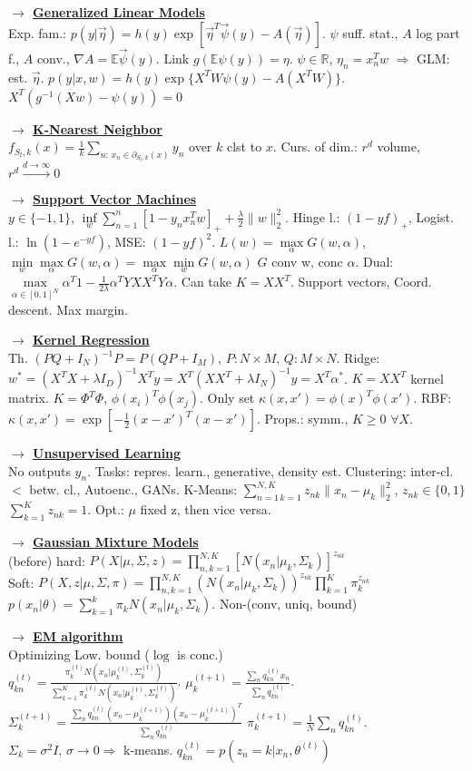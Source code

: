\documentclass[11pt]{article}
\newcommand{\mytitle}[1]{ {\bf $\rightarrow$ \underline{#1}}\\}
\begin{document}
\begin{multicols*}{2}
\mytitle{Generalized Linear Models}
Exp. fam.: $p(y|\vec{\eta})=h(y)\exp\left[\vec{\eta}^T\vec{\psi}(y)-A(\vec{\eta})\right]$.
$\psi$ suff. stat., $A$ log part f.,
$A$ conv., $\nabla A=\mathbb{E}\vec{\psi}(y)$. Link $g(\mathbb{E}\psi(y))=\eta$.
$\psi\in \mathbb{R}$, $\eta_n=x_n^Tw$ $\Rightarrow$ GLM: est. $\vec{\eta}$.
$p(y|x,w)=h(y)\exp\{X^TW\psi(y)-A(X^TW)\}$.
$X^T(g^{-1}(Xw)-\psi(y))=0$

\mytitle{K-Nearest Neighbor}
$f_{S_t,k}(x)=\frac{1}{k}\sum\limits_{n\colon\,x_n\in \partial_{S_t,k}(x)}y_n$ over $k$ clst to $x$.
Curs. of dim.: $r^d$ volume, $r^d\overset{d\to\infty}\to 0$

\mytitle{Support Vector Machines}
$y\in\{-1,1\}$, $\inf\limits_w\sum\limits_{n=1}^n\left[1-y_nx_n^Tw\right]_++\frac{\lambda}{2}\|w\|^2_2$.
Hinge l.: $(1-yf)_+$, Logist. l.: $\ln(1-e^{-yf})$, MSE: $(1-yf)^2$.
$L(w)=\max\limits_\alpha G(w,\alpha)$, $\min\limits_w\max\limits_\alpha G(w,\alpha)=\max\limits_\alpha\min\limits_w G(w,\alpha)$
$G$ conv w, conc $\alpha$.
Dual: $\max\limits_{\alpha\in[0,1]^N}\alpha^T1-\frac{1}{2\lambda}\alpha^TYXX^TY\alpha$.
Can take $K=XX^T$. Support vectors, Coord. descent. Max margin.

\mytitle{Kernel Regression}
Th. $(PQ+I_N)^{-1}P=P(QP+I_M)$, $P\colon N\times M$, $Q\colon M\times N$.
Ridge: $w^*=(X^TX+\lambda I_D)^{-1}X^Ty=X^T(XX^T+\lambda I_N)^{-1}y=X^T\alpha^*$.
$K=XX^T$ kernel matrix. $K=\Phi^T\Phi$, $\phi(x_i)^T\phi(x_j)$.
Only set $\kappa(x,x')=\phi(x)^T\phi(x')$.
RBF: $\kappa(x,x')=\exp\left[-\frac{1}{2}(x-x')^T(x-x')\right]$.
Props.: symm., $K\geqslant 0$ $\forall X$.

\mytitle{Unsupervised Learning}
No outputs $y_n$. Tasks: repres. learn., generative, density est.
Clustering: inter-cl. $<$ betw. cl., Autoenc., GANs.
K-Means: $\sum\limits_{n=1\,k=1}^{N,K}z_{nk}\|x_n-\mu_k\|_2^2$, $z_{nk}\in\{0,1\}$
$\sum\limits_{k=1}^Kz_{nk}=1$. Opt.: $\mu$ fixed z, then vice versa.

\mytitle{Gaussian Mixture Models}
(before) hard: $P(X|\mu,\Sigma,z)=\prod\limits_{n,k=1}^{N,K}\left[N(x_n|\mu_k,\Sigma_k)\right]^{z_{nk}}$\\
Soft: $P(X,z|\mu,\Sigma,\pi)=\prod\limits_{n,k=1}^{N,K}(N(x_n|\mu_k,\Sigma_k))^{z_{nk}}\prod\limits_{k=1}^K\pi_k^{z_{nk}}$\\
$p(x_n|\theta)=\sum\limits_{k=1}^k\pi_kN(x_n|\mu_k,\Sigma_k)$.
Non-(conv, uniq, bound)

\mytitle{EM algorithm}
Optimizing Low. bound ($\log$ is conc.)\\
$q_{kn}^{(t)}=\frac{\pi_k^{(t)}N(x_n|\mu_k^{(t)},\Sigma_k^{(t)})}{\sum\limits_{k=1}^K\pi_k^{(t)}N(x_n|\mu_k^{(t)},\Sigma_k^{(t)})}$.
$\mu_k^{(t+1)}=\frac{\sum_nq_{kn}^{(t)}x_n}{\sum_n q_{kn}^{(t)}}$.\\
$\Sigma_k^{(t+1)}=\frac{\sum_nq_{kn}^{(t)}(x_n-\mu_k^{(t+1)})(x_n-\mu_k^{(t+1)})^T}{\sum_nq_{kn}^{(t)}}$
$\pi_k^{(t+1)}=\frac{1}{N}\sum_nq_{kn}^{(t)}$.
$\Sigma_k=\sigma^2I,\,\sigma\to0\Rightarrow$ k-means.
$q_{kn}^{(t)}=p(z_n=k|x_n,\theta^{(t)})$


\end{multicols*}
\end{document}
